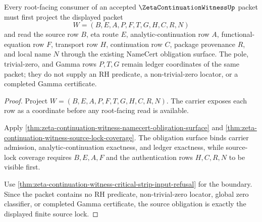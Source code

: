 \begin{theorem}
\label{thm:zeta-continuation-witness-source-obligation}
Every root-facing consumer of an accepted $\ZetaContinuationWitnessUp$ packet must first project the displayed packet
$$
W=(B,E,A,P,F,T,G,H,C,R,N)
$$
and read the source row $B$, eta route $E$, analytic-continuation row $A$, functional-equation row $F$, transport row $H$, continuation row $C$, package provenance $R$, and local name $N$ through the existing NameCert obligation surface. The pole, trivial-zero, and Gamma rows $P,T,G$ remain ledger coordinates of the same packet; they do not supply an RH predicate, a non-trivial-zero locator, or a completed Gamma certificate.
\end{theorem}
\begin{proof}
Project $W=(B,E,A,P,F,T,G,H,C,R,N)$. The carrier exposes each row as a coordinate before any root-facing read is available.

Apply \autoref{thm:zeta-continuation-witness-namecert-obligation-surface} and \autoref{thm:zeta-continuation-witness-source-lock-coverage}. The obligation surface binds carrier admission, analytic-continuation exactness, and ledger exactness, while source-lock coverage requires $B,E,A,F$ and the authentication rows $H,C,R,N$ to be visible first.

Use \autoref{thm:zeta-continuation-witness-critical-strip-input-refusal} for the boundary. Since the packet contains no RH predicate, non-trivial-zero locator, global zero classifier, or completed Gamma certificate, the source obligation is exactly the displayed finite source lock.
\end{proof}

